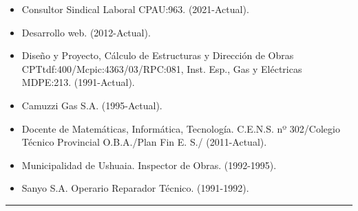 \documentclass[a4paper,oneside,9pt]{article}
\begin{document}
\begin{multicols}{2} 
\begin{itemize}
    \item Consultor Sindical Laboral CPAU:963. (2021-Actual).
    \item Desarrollo web. (2012-Actual).
    \item Diseño y Proyecto, Cálculo de Estructuras y Dirección de Obras CPTtdf:400/Mcpic:4363/03/RPC:081, Inst. Esp., Gas y Eléctricas MDPE:213. (1991-Actual).
    \item Camuzzi Gas S.A. (1995-Actual).
    \item Docente de Matemáticas, Informática, Tecnología. C.E.N.S. nº 302/Colegio Técnico Provincial O.B.A./Plan Fin E. S./ (2011-Actual).
    \item Municipalidad de Ushuaia. Inspector de Obras. (1992-1995).
    \item Sanyo S.A. Operario Reparador Técnico. (1991-1992).
\end{itemize}
\end{multicols}
\hrule
\end{document}
